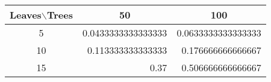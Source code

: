\begin{tabular}{crr}
 \toprule
 Leaves$\backslash$Trees  & \multicolumn{1}{c}{50} & \multicolumn{1}{c}{100}\\
 \midrule
 5 & 0.0433333333333333 & 0.0633333333333333 \\ 
 10 & 0.113333333333333 & 0.176666666666667 \\ 
 15 & 0.37 & 0.506666666666667 \\ 
\bottomrule 
\end{tabular} 
